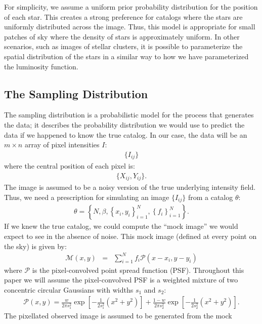 \documentclass[manuscript]{aastex}
\begin{document}
For simplicity, we assume a uniform prior probability distribution for the
position of each star. This creates a strong preference for catalogs where
the stars are uniformly distributed across the image. Thus, this model is
appropriate for small patches of sky where the density of stars is approximately
uniform. In other scenarios, such as images of stellar clusters, it is possible
to parameterize the spatial distribution of the stars in a similar way to how
we have parameterized the luminosity function.

\subsection{The Sampling Distribution}
The sampling distribution is a probabilistic model for the process that
generates the data; it describes the probability distribution we would use
to predict the data if we happened to know the true catalog. In our case,
the data will be an $m \times n$ array of pixel intensities $I$:
\begin{eqnarray}
\{I_{ij}\}
\end{eqnarray}
where the central position of each pixel is:
\begin{eqnarray}
\{X_{ij}, Y_{ij}\}.
\end{eqnarray}
The image is assumed to be a noisy version of the true underlying intensity
field. Thus, we need
a prescription for simulating an image $\{I_{ij}\}$ from a catalog $\theta$:
\begin{eqnarray}
\theta = \left\{N, \beta, \left\{x_i, y_i\right\}_{i=1}^N,
\left\{f_i\right\}_{i=1}^N\right\}.
\end{eqnarray}
If we knew the true catalog, we could compute the
``mock image'' we would expect to see
in the absence of noise. This mock image (defined at every point on the sky)
is given by:
\begin{eqnarray}
\mathcal{M}(x, y) &=& \sum_{i=1}^N f_i \mathcal{P}(x - x_i, y - y_i)
\end{eqnarray}
where $\mathcal{P}$ is the pixel-convolved point spread function (PSF).
Throughout this paper we will
assume the pixel-convolved PSF is a weighted mixture of two concentric
circular
Gaussians with widths $s_1$ and $s_2$:
\begin{eqnarray}
\mathcal{P}(x, y) = \frac{w}{2\pi s_1^2}\exp
\left[
-\frac{1}{2s_1^2}\left(x^2 + y^2\right)
\right]
+ \frac{1-w}{2\pi s_2^2}\exp
\left[-\frac{1}{2s_2^2}\left(x^2 + y^2\right)
\right].
\end{eqnarray}
The pixellated observed image is assumed to be generated from the mock
\end{document}
